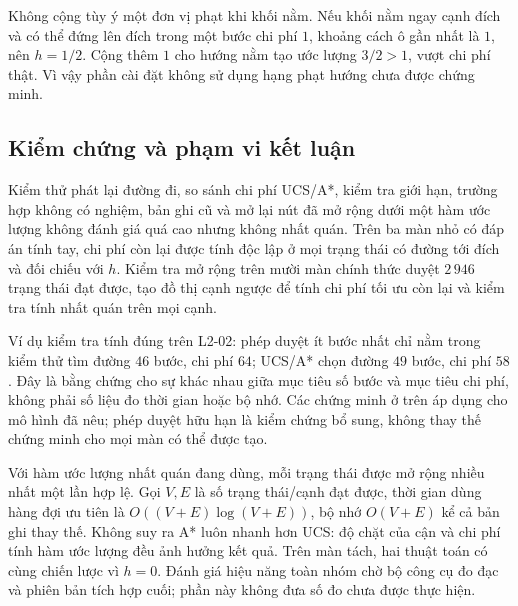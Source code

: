 Không cộng tùy ý một đơn vị phạt khi khối nằm. Nếu khối nằm ngay cạnh đích và
có thể đứng lên đích trong một bước chi phí $1$, khoảng cách ô gần nhất là $1$,
nên $h=1/2$. Cộng thêm $1$ cho hướng nằm tạo ước lượng $3/2>1$, vượt chi phí
thật. Vì vậy phần cài đặt không sử dụng hạng phạt hướng chưa được chứng minh.

\subsection{Kiểm chứng và phạm vi kết luận}
Kiểm thử phát lại đường đi, so sánh chi phí UCS/A*, kiểm tra giới hạn, trường
hợp không có nghiệm, bản ghi cũ và mở lại nút đã mở rộng dưới một hàm ước lượng
không đánh giá quá cao nhưng không nhất quán. Trên ba màn nhỏ có đáp án tính
tay, chi phí còn lại được tính độc lập ở mọi trạng thái có đường tới đích và
đối chiếu với $h$. Kiểm tra mở rộng trên mười màn chính thức duyệt $2\,946$
trạng thái đạt được, tạo đồ thị cạnh ngược để tính chi phí tối ưu còn lại và
kiểm tra tính nhất quán trên mọi cạnh.

Ví dụ kiểm tra tính đúng trên L2-02: phép duyệt ít bước nhất chỉ nằm trong
kiểm thử tìm đường $46$ bước, chi phí $64$; UCS/A* chọn đường $49$ bước, chi
phí $58$. Đây là bằng chứng cho sự khác nhau giữa mục tiêu số bước và mục tiêu
chi phí, không phải số liệu đo thời gian hoặc bộ nhớ. Các chứng minh ở trên
áp dụng cho mô hình đã nêu; phép duyệt hữu hạn là kiểm chứng bổ sung, không
thay thế chứng minh cho mọi màn có thể được tạo.

Với hàm ước lượng nhất quán đang dùng, mỗi trạng thái được mở rộng nhiều nhất
một lần hợp lệ. Gọi $V,E$ là số trạng thái/cạnh đạt được, thời gian dùng hàng
đợi ưu tiên là $O((V+E)\log(V+E))$, bộ nhớ $O(V+E)$ kể cả bản ghi thay thế.
Không suy ra A* luôn nhanh hơn UCS: độ chặt của cận và chi phí tính hàm ước
lượng đều ảnh hưởng kết quả. Trên màn tách, hai thuật toán có cùng chiến lược
vì $h=0$. Đánh giá hiệu năng toàn nhóm chờ bộ công cụ đo đạc và phiên bản tích
hợp cuối; phần này không đưa số đo chưa được thực hiện.
